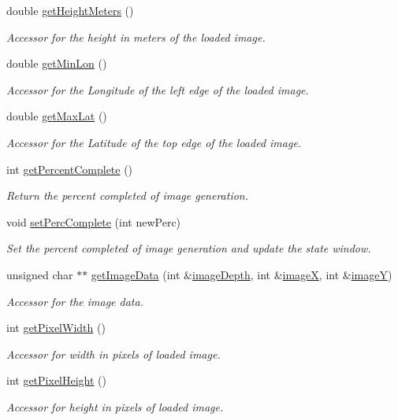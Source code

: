 \begin{DoxyCompactItemize}
double \hyperlink{class_geomap3_d_ad4ef60d7dd75d3f8f15027919c5cf9e8}{getHeightMeters} ()
\begin{DoxyCompactList}\small\item\em Accessor for the height in meters of the loaded image. \end{DoxyCompactList}\item 
double \hyperlink{class_geomap3_d_ae9b9dde88a55b74f4d2c83288891a7ed}{getMinLon} ()
\begin{DoxyCompactList}\small\item\em Accessor for the Longitude of the left edge of the loaded image. \end{DoxyCompactList}\item 
double \hyperlink{class_geomap3_d_a068217570a65e7000e36199752988b07}{getMaxLat} ()
\begin{DoxyCompactList}\small\item\em Accessor for the Latitude of the top edge of the loaded image. \end{DoxyCompactList}\item 
int \hyperlink{class_geomap3_d_a6790c50adc6f6a1be16971a21adf44d8}{getPercentComplete} ()
\begin{DoxyCompactList}\small\item\em Return the percent completed of image generation. \end{DoxyCompactList}\item 
void \hyperlink{class_geomap3_d_a320f51df683d8cdf8fa0b40e311be26b}{setPercComplete} (int newPerc)
\begin{DoxyCompactList}\small\item\em Set the percent completed of image generation and update the state window. \end{DoxyCompactList}\item 
unsigned char $\ast$$\ast$ \hyperlink{class_geomap3_d_a1ca74b09b3cf4ae444c00ddfd67e7df1}{getImageData} (int \&\hyperlink{class_geomap3_d_a6eb34415f8711c175c3e2de62fce649f}{imageDepth}, int \&\hyperlink{class_geomap3_d_a727dff35321b9f86360873dea21825d3}{imageX}, int \&\hyperlink{class_geomap3_d_afa780dc6562152adfc5226951aca934d}{imageY})
\begin{DoxyCompactList}\small\item\em Accessor for the image data. \end{DoxyCompactList}\item 
int \hyperlink{class_geomap3_d_a9c7ad55aa600986c59ad8d9fc85ce4ab}{getPixelWidth} ()
\begin{DoxyCompactList}\small\item\em Accessor for width in pixels of loaded image. \end{DoxyCompactList}\item 
int \hyperlink{class_geomap3_d_ae2fe93c7d664fb0416870e94d5f14c68}{getPixelHeight} ()
\begin{DoxyCompactList}\small\item\em Accessor for height in pixels of loaded image. \end{DoxyCompactList}\end{DoxyCompactItemize}
